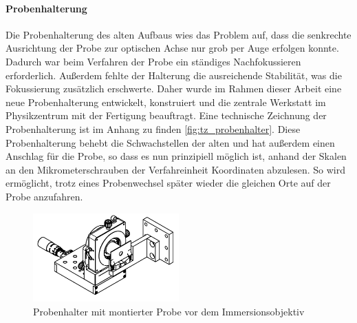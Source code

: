 \documentclass[titlepage,  ngerman]{article}
\begin{document}
	\paragraph{Probenhalterung}
	Die Probenhalterung des alten Aufbaus wies das Problem auf, dass die senkrechte Ausrichtung der Probe zur optischen Achse nur grob per Auge erfolgen konnte. Dadurch war beim Verfahren der Probe ein ständiges Nachfokussieren erforderlich. Außerdem fehlte der Halterung die ausreichende Stabilität, was die Fokussierung zusätzlich erschwerte. Daher wurde im Rahmen dieser Arbeit eine neue Probenhalterung entwickelt, konstruiert und die zentrale Werkstatt im Physikzentrum mit der Fertigung beauftragt. Eine technische Zeichnung der Probenhalterung ist im Anhang zu finden \ref{fig:tz_probenhalter}. Diese Probenhalterung behebt die Schwachstellen der alten und hat außerdem einen Anschlag für die Probe, so dass es nun prinzipiell möglich ist, anhand der Skalen an den Mikrometerschrauben der Verfahreinheit Koordinaten abzulesen. So wird ermöglicht, trotz eines Probenwechsel später wieder die gleichen Orte auf der Probe anzufahren.
	\begin{figure}[htbp] 
		\centering
		\includegraphics[width=0.5\textwidth]{figures/Probenhalter.pdf}
		\caption[Probenhalterung]{Probenhalter mit montierter Probe vor dem Immersionsobjektiv}
		\label{fig:probenhalter}
	\end{figure}
\end{document}
